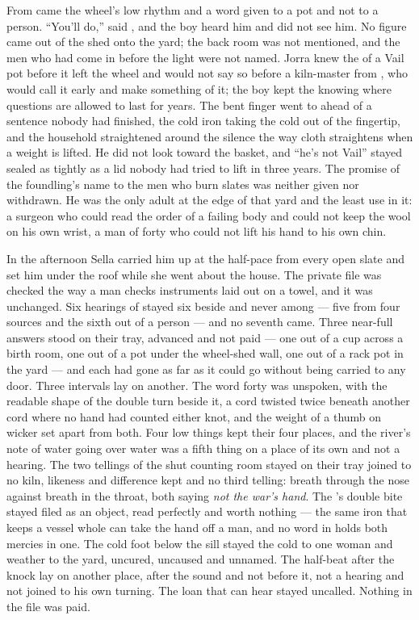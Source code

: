 From  came the wheel's low rhythm and a word given to a pot and not to a person. “You'll do,” said , and the boy heard him and did not see him. No figure came out of the shed onto the yard; the back room was not mentioned, and the men who had come in before the light were not named. Jorra knew the  of a Vail pot before it left the wheel and would not say so before a kiln-master from , who would call it early and make something of it; the boy kept the knowing where questions are allowed to last for years. The bent finger went to  ahead of a sentence nobody had finished, the cold iron taking the cold out of the fingertip, and the household straightened around the silence the way cloth straightens when a weight is lifted. He did not look toward the basket, and “he's not Vail” stayed sealed as tightly as a lid nobody had tried to lift in three years. The promise of the foundling's name to the men who burn slates was neither given nor withdrawn. He was the only adult at the edge of that yard and the least use in it: a surgeon who could read the order of a failing body and could not keep the wool on his own wrist, a man of forty who could not lift his hand to his own chin.

\scenebreak

In the afternoon Sella carried him up at the half-pace from every open slate and set him under the  roof while she went about the house. The private file was checked the way a man checks instruments laid out on a towel, and it was unchanged. Six hearings of  stayed six beside and never among --- five from four sources and the sixth out of a person --- and no seventh came. Three near-full answers stood on their tray, advanced and not paid --- one out of a cup across a birth room, one out of a pot under the wheel-shed wall, one out of a rack pot in the yard --- and each had gone as far as it could go without being carried to any door. Three intervals lay on another. The word forty was unspoken, with the readable shape of the double turn beside it, a cord twisted twice beneath another cord where no hand had counted either knot, and the weight of a thumb on wicker set apart from both. Four low things kept their four places, and the river's note of water going over water was a fifth thing on a place of its own and not a hearing. The two tellings of the shut counting room stayed on their tray joined to no kiln, likeness and difference kept and no third telling: breath through the nose against breath in the throat, both saying \emph{not the war's hand}. The 's double bite stayed filed as an object, read perfectly and worth nothing --- the same iron that keeps a vessel whole can take the hand off a man, and no word in  holds both mercies in one. The cold foot below the sill stayed the cold to one woman and weather to the yard, uncured, uncaused and unnamed. The half-beat after the knock lay on another place, after the sound and not before it, not a hearing and not joined to his own turning. The loan that can hear stayed uncalled. Nothing in the file was paid.

